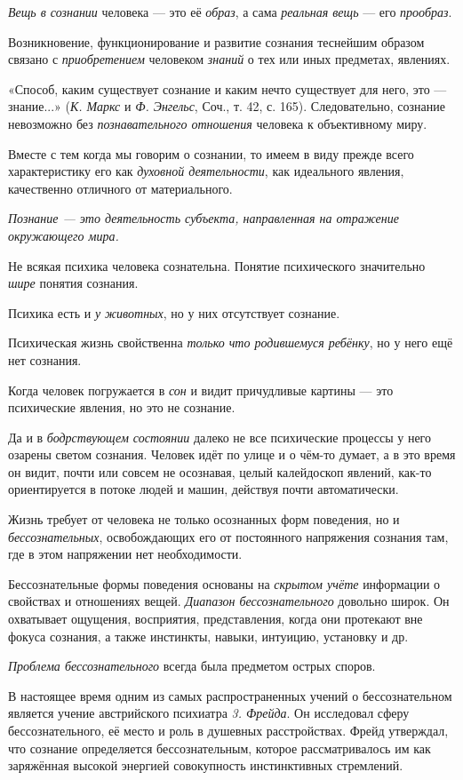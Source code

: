 \documentclass[a4paper,14pt,russian]{extreport}
\begin{document}
\emph{Вещь в сознании} человека --- это её \emph{образ}, а сама \emph{реальная вещь} --- его \emph{прообраз}.

Возникновение, функционирование и развитие сознания теснейшим образом связано с \emph{приобретением} человеком \emph{знаний} о тех или иных предметах, явлениях.

«Способ, каким существует сознание и каким нечто существует для него, это --- знание...» (\emph{К. Маркс} и \emph{Ф. Энгельс}, Соч., т. 42, с. 165). Следовательно, сознание невозможно без \emph{познавательного отношения} человека к объективному миру.

Вместе с тем когда мы говорим о сознании, то имеем в виду прежде всего характеристику его как \emph{духовной деятельности}, как идеального явления, качественно отличного от материального.

\emph{Познание --- это деятельность субъекта, направленная на отражение окружающего мира.}

Не всякая психика человека сознательна. Понятие психического значительно \emph{шире} понятия сознания.

Психика есть и \emph{у животных}, но у них отсутствует сознание.

Психическая жизнь свойственна \emph{только что родившемуся ребёнку}, но у него ещё нет сознания.

Когда человек погружается в \emph{сон} и видит причудливые картины --- это психические явления, но это не сознание.

Да и в \emph{бодрствующем состоянии} далеко не все психические процессы у него озарены светом сознания. Человек идёт по улице и о чём-то думает, а в это время он видит, почти или совсем не осознавая, целый калейдоскоп явлений, как-то ориентируется в потоке людей и машин, действуя почти автоматически.

Жизнь требует от человека не только осознанных форм поведения, но и \emph{бессознательных}, освобождающих его от постоянного напряжения сознания там, где в этом напряжении нет необходимости.

Бессознательные формы поведения основаны на \emph{скрытом учёте} информации о свойствах и отношениях вещей. \emph{Диапазон бессознательного} довольно широк. Он охватывает ощущения, восприятия, представления, когда они протекают вне фокуса сознания, а также инстинкты, навыки, интуицию, установку и др.

\emph{Проблема бессознательного} всегда была предметом острых споров.

В настоящее время одним из самых распространенных учений о бессознательном является учение австрийского психиатра \emph{3. Фрейда}. Он исследовал сферу бессознательного, её место и роль в душевных расстройствах. Фрейд утверждал, что сознание определяется бессознательным, которое рассматривалось им как заряжённая высокой энергией совокупность инстинктивных стремлений.
\end{document}
